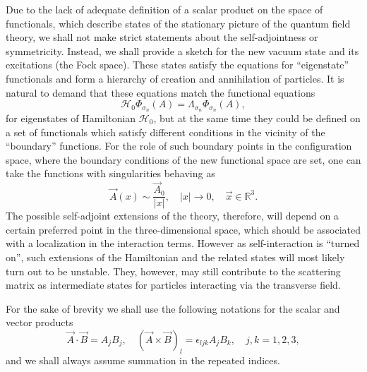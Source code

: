\documentclass[12pt]{article}
\newcommand{\HH}{\mathscr{H}}
\newcommand{\RR}{\mathbb{R}}
\begin{document}
    Due to the lack of adequate definition of a scalar product on the space
    of functionals, which describe states of the stationary picture of the
    quantum field theory, we shall not make strict statements about the
    self-adjointness or symmetricity.
    Instead, we shall provide a sketch for the new vacuum state and its
    excitations (the Fock space).
    These states satisfy the equations for ``eigenstate'' functionals and
	form a hierarchy of creation and annihilation of particles.
	It is natural to demand that these equations match
	the functional equations
\begin{equation*}
    \HH_{0} \Phi_{\sigma_{n}}(A) = \Lambda_{\sigma_{n}} \Phi_{\sigma_{n}}(A) ,
\end{equation*}
	for eigenstates of Hamiltonian
$ \HH_{0} $,
	but at the same time they could be defined on a set of functionals
	which satisfy different conditions in the vicinity of the ``boundary''
    functions.
	For the role of such boundary points in the configuration space,
	where the boundary conditions of the new functional space are set,
	one can take the functions with singularities behaving as
\begin{equation}
\label{Asing}
    \vec{A}(x) \sim \frac{\vec{A}_{0}}{|x|}, \quad |x| \to 0 ,
	\quad \vec{x} \in \RR^{3} .
\end{equation}
	The possible self-adjoint extensions of the theory, therefore,
    will depend on a
	certain preferred point in the three-dimensional space,
    which should be associated with a localization in the interaction terms.
    However as
	self-interaction is ``turned on'',
	such extensions of the Hamiltonian and the related states will most
	likely turn out to be unstable.
	They, however, may still contribute to the scattering matrix as
	intermediate states for particles interacting via the transverse field.

    For the sake of brevity we shall use
    the following notations for the scalar and vector products
\begin{equation*}
    \vec{A}\cdot\vec{B} = A_{j}B_{j} ,\quad
	(\vec{A}\times\vec{B})_{l} = \epsilon_{ljk} A_{j} B_{k} ,
    \quad j,k= 1,2,3,
\end{equation*}
    and we shall always assume summation in the repeated indices.

\end{document}
